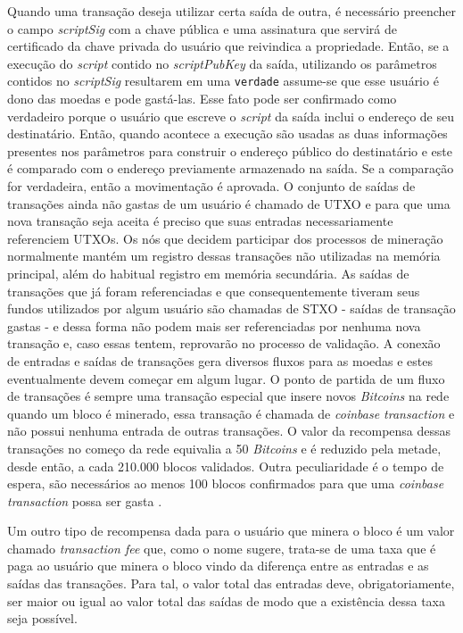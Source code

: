 %
%
%
%
Quando uma transação deseja utilizar certa saída de outra, é necessário preencher o campo \textit{scriptSig} com a chave pública e uma assinatura que servirá de certificado da chave privada do usuário que reivindica a propriedade. Então, se a execução do \textit{script} contido no \textit{scriptPubKey} da saída, utilizando os parâmetros contidos no \textit{scriptSig} resultarem em uma \texttt{verdade} assume-se que esse usuário é dono das moedas e pode gastá-las. Esse fato pode ser confirmado como verdadeiro porque o usuário que escreve o \textit{script} da saída inclui o endereço de seu destinatário. Então, quando acontece a execução são usadas as duas informações presentes nos parâmetros para construir o endereço público do destinatário e este é comparado com o endereço previamente armazenado na saída. Se a comparação for verdadeira, então a movimentação é aprovada.
%
O conjunto de saídas de transações ainda não gastas de um usuário é chamado de \ac{UTXO} e para que uma nova transação seja aceita é preciso que suas entradas necessariamente referenciem \acp{UTXO}. Os nós que decidem participar dos processos de mineração normalmente mantém um registro dessas transações não utilizadas na memória principal, além do habitual registro em memória secundária. As saídas de transações que já foram referenciadas e que consequentemente tiveram seus fundos utilizados por algum usuário são chamadas de \ac{STXO} - saídas de transação gastas - e dessa forma não podem mais ser referenciadas por nenhuma nova transação e, caso essas tentem, reprovarão no processo de validação.
%
A conexão de entradas e saídas de transações gera diversos fluxos para as moedas e estes eventualmente devem começar em algum lugar. O ponto de partida de um fluxo de transações é sempre uma transação especial que insere novos \textit{Bitcoins} na rede quando um bloco é minerado, essa transação é chamada de \textit{coinbase transaction} e não possui nenhuma entrada de outras transações. O valor da recompensa dessas transações no começo da rede equivalia a 50 \textit{Bitcoins} e é reduzido pela metade, desde então, a cada 210.000 blocos validados. Outra peculiaridade é o tempo de espera, são necessários ao menos 100 blocos confirmados para que uma \textit{coinbase transaction} possa ser gasta \cite{blockchain:survey_bitcoin}.

%
Um outro tipo de recompensa dada para o usuário que minera o bloco é um valor chamado \textit{transaction fee} que, como o nome sugere, trata-se de uma taxa que é paga ao usuário que minera o bloco vindo da diferença entre as entradas e as saídas das transações. Para tal, o valor total das entradas deve, obrigatoriamente, ser maior ou igual ao valor total das saídas de modo que a existência dessa taxa seja possível.

